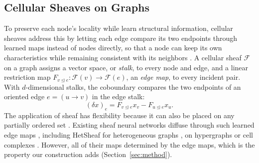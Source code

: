 \documentclass{article}
\newcommand{\inc}{\trianglelefteq}
\begin{document}
\subsection{Cellular Sheaves on Graphs}
To preserve each node's locality while learn structural information, cellular sheaves address this by letting each edge compare its two endpoints through learned maps instead of nodes directly, so that a node can keep its own characteristics while remaining consistent with its neighbors \cite{hansen2020sheaf,bodnar2022neural}. A cellular sheaf $\mathcal{F}$ on a graph assigns a vector space, or \emph{stalk}, to every node and edge, and a linear restriction map $F_{v\inc e}:\mathcal{F}(v)\rightarrow\mathcal{F}(e)$, an \emph{edge map}, to every incident pair. With $d$-dimensional stalks, the coboundary compares the two endpoints of an oriented edge $e=(u\rightarrow v)$ in the edge stalk:
\begin{equation}
  (\delta x)_e = F_{v\inc e}x_v-F_{u\inc e}x_u .
  \label{eq:coboundary}
\end{equation}
 The application of sheaf has flexibility because it can also be placed on any partially ordered set \cite{curry2014sheaves}. Existing sheaf neural networks diffuse through such learned edge maps \cite{hansen2020sheaf,bodnar2022neural,barbero2022sheaf,fiorini2025sheaves,ribeiro2026cooperative}, including HetSheaf for heterogeneous graphs \cite{braithwaite2024heterogeneous}, on hypergraphs \cite{duta2023sheafhyper} or cell complexes \cite{bodnar2021cwn,hajij2022tdl,hajij2025ctnn}. However, all of their maps determined by the edge maps, which is the property our construction adds (Section~\ref{sec:method}).
\end{document}
